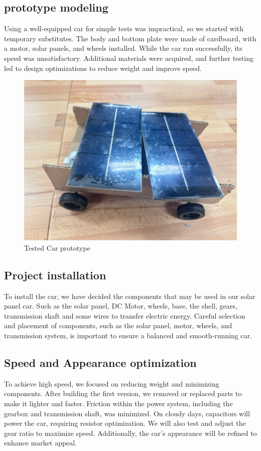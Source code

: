 \documentclass[12pt]{article}
\begin{document}
\subsection{prototype modeling}
Using a well-equipped car for simple tests was impractical, so we started with temporary substitutes. The body and bottom plate were made of cardboard, with a motor, solar panels, and wheels installed. While the car ran successfully, its speed was unsatisfactory. Additional materials were acquired, and further testing led to design optimizations to reduce weight and improve speed.
\begin{figure}[h] 
    \centering 
    \includegraphics[width=1\textwidth]{figure/car_prototype.jpg}
    \caption{Tested Car prototype}
\end{figure}
\subsection{Project installation}
To install the car, we have decided the components that may be used in our solar panel car.
Such as the solar panel, DC Motor, wheels, base, the shell, gears, transmission shaft and some wires to transfer electric energy. 
Careful selection and placement of components, such as the solar panel, motor, wheels, and transmission system, is important to ensure a balanced and smooth-running car\cite{Hapuwatte2017}. 
\subsection{Speed and Appearance optimization}
To achieve high speed, we focused on reducing weight and minimizing components. After building the first version, we removed or replaced parts to make it lighter and faster. 
Friction within the power system, including the gearbox and transmission shaft, was minimized. 
On cloudy days, capacitors will power the car, requiring resistor optimization. 
We will also test and adjust the gear ratio to maximize speed. Additionally, the car's appearance will be refined to enhance market appeal.
\end{document}
